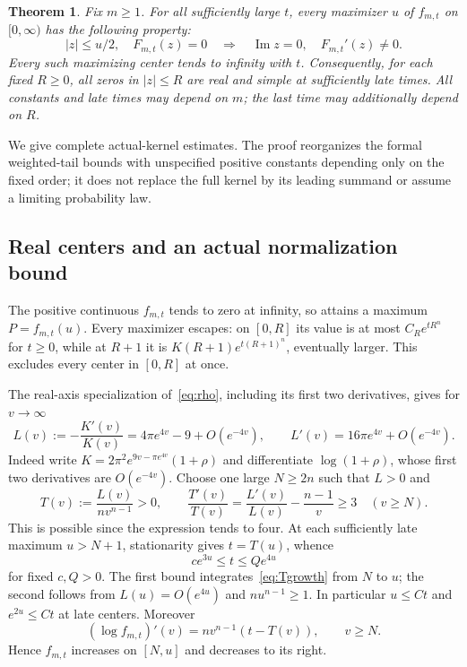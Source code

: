 \documentclass[11pt]{article}
\newtheorem{theorem}{Theorem}[section]
\begin{document}
\begin{theorem}\label{thm:evenwindow}
Fix $m\geq1$. For all sufficiently large $t$, every maximizer $u$ of
$f_{m,t}$ on $[0,\infty)$ has the following property:
\[
 |z|\leq u/2,\quad F_{m,t}(z)=0
 \quad\Longrightarrow\quad \operatorname{Im}z=0,\quad F_{m,t}'(z)\ne0.
\]
Every such maximizing center tends to infinity with $t$. Consequently,
for each fixed $R\geq0$, all zeros in $|z|\leq R$ are real and simple
at sufficiently late times. All constants and late times may depend
on $m$; the last time may additionally depend on $R$.
\end{theorem}

We give complete actual-kernel estimates. The proof reorganizes the
formal weighted-tail bounds with unspecified positive constants
depending only on the fixed order; it does not replace the full kernel
by its leading summand or assume a limiting probability law.

\subsection{Real centers and an actual normalization bound}
The positive continuous $f_{m,t}$ tends to zero at infinity, so attains
a maximum $P=f_{m,t}(u)$. Every maximizer escapes: on $[0,R]$ its
value is at most $C_R e^{tR^n}$ for $t\geq0$, while at $R+1$ it is
$K(R+1)e^{t(R+1)^n}$, eventually larger. This excludes every center
in $[0,R]$ at once.

The real-axis specialization of~\eqref{eq:rho}, including its first
two derivatives, gives for $v\to\infty$
\[
 L(v):=-\frac{K'(v)}{K(v)}=4\pi e^{4v}-9+O(e^{-4v}),\qquad
 L'(v)=16\pi e^{4v}+O(e^{-4v}).
\]
Indeed write $K=2\pi^2e^{9v-\pi e^{4v}}(1+\rho)$ and differentiate
$\log(1+\rho)$, whose first two derivatives are $O(e^{-4v})$.
Choose one large $N\geq2n$ such that $L>0$ and
\begin{equation}\label{eq:Tgrowth}
 T(v):=\frac{L(v)}{nv^{n-1}}>0,\qquad
 \frac{T'(v)}{T(v)}=\frac{L'(v)}{L(v)}-\frac{n-1}{v}\geq3
 \quad(v\geq N).
\end{equation}
This is possible since the expression tends to four. At each sufficiently
late maximum $u>N+1$, stationarity gives $t=T(u)$, whence
\begin{equation}\label{eq:even-time-center}
 c e^{3u}\leq t\leq Qe^{4u}
\end{equation}
for fixed $c,Q>0$. The first bound integrates~\eqref{eq:Tgrowth}
from $N$ to $u$; the second follows from $L(u)=O(e^{4u})$ and
$nu^{n-1}\geq1$. In particular $u\leq C t$ and $e^{2u}\leq Ct$
at late centers. Moreover
\[
 (\log f_{m,t})'(v)=nv^{n-1}(t-T(v)),\qquad v\geq N.
\]
Hence $f_{m,t}$ increases on $[N,u]$ and decreases to its right.
\end{document}
